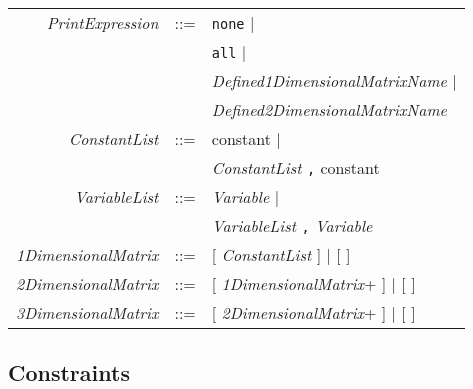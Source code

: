 \documentclass{article}
\begin{document}
\begin{small}
\begin{tabular}{rcl}
\textit{PrintExpression} & ::= & \texttt{none} $\mid$ \\
						 &     & \texttt{all}  $\mid$ \\
                         &     & \textit{Defined1DimensionalMatrixName} $\mid$ \\
                         &     & \textit{Defined2DimensionalMatrixName}  \\
                         

\textit{ConstantList}  & ::= & constant $\mid$\\
                       &     & \textit{ConstantList} \texttt{,} constant \\     

\textit{VariableList}& ::= & \textit{Variable} $\mid$ \\   
                       &   & \textit{VariableList} \texttt{,} \textit{Variable} \\

\textit{1DimensionalMatrix} & ::= & [ \textit{ConstantList} ] $\mid$ [ ] \\

\textit{2DimensionalMatrix} & ::= & [ \textit{1DimensionalMatrix}+ ] $\mid$ [ ]\\

\textit{3DimensionalMatrix} & ::= & [ \textit{2DimensionalMatrix}+ ] $\mid$ [ ] \\

\end{tabular}


\subsection{Constraints}
\begin{tabular}{rcl}



\end{tabular}
\end{small}
\end{document}
